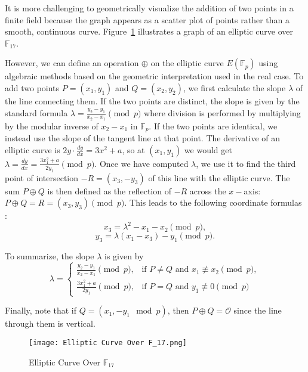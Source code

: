 \documentclass[11pt]{article}
\begin{document}
It is more challenging to geometrically visualize the addition of two points in a finite field because the graph appears as a scatter plot of points rather than a smooth, continuous curve. Figure~\ref{fig:finite} illustrates a graph of an elliptic curve over \(\mathbb{F}_{17}\). 

\vspace{0.3cm}

 However, we can define an operation \( \oplus \) on the elliptic curve \( E(\mathbb{F}_p) \) using algebraic methods based on the geometric interpretation used in the real case. To add two points \(P=(x_1,y_1)\) and \(Q=(x_2,y_2)\), we first calculate the slope \( \lambda \) of the line connecting them. If the two points are distinct, the slope is given by the standard formula \(\lambda =\frac{y_2-y_1}{x_2-x_1} \pmod{p}\) where division is performed by multiplying by the modular inverse of \(x_2 -x_1\) in \(\mathbb{F}_p\). If the two points are identical, we instead use the slope of the tangent line at that point. The derivative of an elliptic curve is \(2y\cdot \frac{dy}{dx}=3x^2+a\), so at \((x_1,y_1)\) we would get \(\lambda =\frac{dy}{dx}=\frac{3x_1^2+a}{2y_1} \pmod{p}\). Once we have computed \(\lambda\), we use it to find the third point of intersection \(-R=(x_3,-y_3)\) of this line with the elliptic curve. The sum \(P\oplus Q\) is then defined as the reflection of \(-R\) across the \(x-\)axis: \(P\oplus Q=R=(x_3,y_3) \pmod{p}\). This leads to the following coordinate formulas \cite{gruska}:
\[x_3 = \lambda^2 - x_1 - x_2 \pmod{p},\]
\[y_3 = \lambda(x_1 - x_3) - y_1 \pmod{p}.\]

To summarize, the slope \( \lambda \) is given by
\[\lambda =
\begin{cases}
\frac{y_2 - y_1}{x_2 - x_1} \pmod{p}, & \text{if } P \neq Q \text{ and } x_1 \not\equiv x_2 \pmod p, \\
\frac{3x_1^2 + a}{2y_1} \pmod{p}, & \text{if } P = Q \text{ and } y_1 \not\equiv 0 \pmod{p}
\end{cases}
\]

\vspace{0.3cm}

Finally, note that if \( Q = (x_1, -y_1 \mod p) \), then \(P\oplus Q=\mathcal{O}\) since the line through them is vertical.

\begin{figure}
  \centering
  \texttt{[image: Elliptic Curve Over F\_17.png]}
  \caption{Elliptic Curve Over \(\mathbb{F}_{17}\)}
  \label{fig:finite}
 \end{figure}
\end{document}
